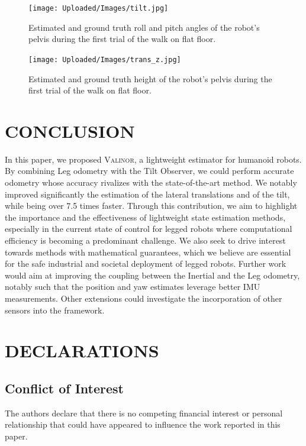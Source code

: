 \documentclass{IJCAS}
\begin{document}
\begin{figure}[!ht]
\begin{center}
\texttt{[image: Uploaded/Images/tilt.jpg]} 
\vskip -0.5pc
\caption{Estimated and ground truth roll and pitch angles of the robot's pelvis during the first trial of the walk on flat floor.}\label{fig:tilt_rhps1}
\end{center}
\vskip -1.5pc
\end{figure}

\begin{figure}[!ht]
\begin{center}
\texttt{[image: Uploaded/Images/trans\_z.jpg]} 
\vskip -0.5pc
\caption{Estimated and ground truth height of the robot's pelvis during the first trial of the walk on flat floor.}\label{fig:trans_z_rhps1}
\end{center}
\vskip -1.5pc
\end{figure}

\section{CONCLUSION}

In this paper, we proposed {\scshape Valinor}, a lightweight estimator for humanoid robots. By combining Leg odometry with the Tilt Observer, we could perform accurate odometry whose accuracy rivalizes with the state-of-the-art method. We notably improved significantly the estimation of the lateral translations and of the tilt, while being over 7.5 times faster. Through this contribution, we aim to highlight the importance and the effectiveness of lightweight state estimation methods, especially in the current state of control for legged robots where computational efficiency is becoming a predominant challenge. We also seek to drive interest towards methods with mathematical guarantees, which we believe are essential for the safe industrial and societal deployment of legged robots. 
Further work would aim at improving the coupling between the Inertial and the Leg odometry, notably such that the position and yaw estimates leverage better IMU measurements. Other extensions could investigate the incorporation of other sensors into the framework.



\section*{DECLARATIONS}

\subsection*{Conflict of Interest }
The authors declare that there is no competing financial interest or personal relationship that could have appeared to influence the work reported in this paper.
\end{document}
